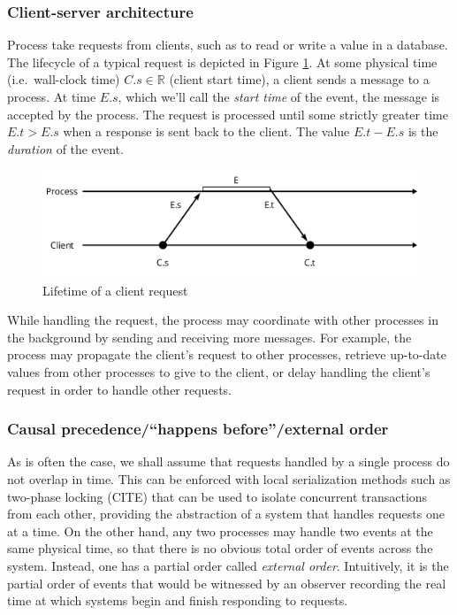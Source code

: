 \documentclass[]             %
{NASA}                       %
\theoremstyle{definition}
\begin{document}
\hypertarget{client-server-architecture}{%
\subsubsection{Client-server
architecture}\label{client-server-architecture}}

Process take requests from clients, such as to read or write a value in
a database. The lifecycle of a typical request is depicted in Figure
\ref{fig:request}. At some physical time (i.e.~wall-clock time)
\(C.s \in \mathbb{R}\) (client start time), a client sends a message to
a process. At time \(E.s\), which we'll call the \emph{start time} of
the event, the message is accepted by the process. The request is
processed until some strictly greater time \(E.t > E.s\) when a response
is sent back to the client. The value \(E.t - E.s\) is the
\emph{duration} of the event.

\begin{figure}[h]
  \center
  \includegraphics[scale=0.4]{images/request.png}
  \caption{Lifetime of a client request}
  \label{fig:request}
\end{figure}

While handling the request, the process may coordinate with other
processes in the background by sending and receiving more messages. For
example, the process may propagate the client's request to other
processes, retrieve up-to-date values from other processes to give to
the client, or delay handling the client's request in order to handle
other requests.

\subsubsection{Causal precedence/``happens before''/external
order}\label{causal-precedencehappens-beforeexternal-order}

As is often the case, we shall assume that requests handled by a single
process do not overlap in time. This can be enforced with local
serialization methods such as two-phase locking (CITE) that can be used
to isolate concurrent transactions from each other, providing the
abstraction of a system that handles requests one at a time. On the
other hand, any two processes may handle two events at the same physical
time, so that there is no obvious total order of events across the
system. Instead, one has a partial order called \emph{external order}.
Intuitively, it is the partial order of events that would be witnessed
by an observer recording the real time at which systems begin and finish
responding to requests.
\end{document}
